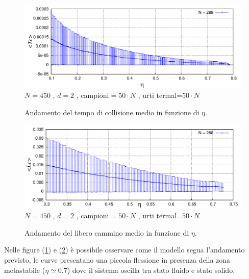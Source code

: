 \documentclass[11pt]{article}
\theoremstyle{plain}
\theoremstyle{remark}
\begin{document}
\begin{figure}[htbp]
\centering
\caption[Sfere Rigide$/$Problema2.cpp]{Andamento del tempo di collisione medio in funzione di $\eta$.}\vspace{-15pt}
\includegraphics[scale=0.95]{Immagini/Rigide/TcvsEta2D}
	\newline \footnotesize{$N= 450$ , $d=2$ , campioni$= 50\cdot N$ ,  urti termal=$ 50 \cdot N$}
	\label{fig: TcvsEta}
\end{figure}
\begin{figure}[htbp]
\centering
\caption[Sfere Rigide$/$Problema4.cpp]{Andamento del libero cammino medio in funzione di $\eta$.}\vspace{-15pt}
\includegraphics[scale=0.95]{Immagini/Rigide/LcvsEta2D}
	\newline \footnotesize{$N= 450$ , $d=2$ , campioni$= 50\cdot N$ ,  urti termal=$ 50 \cdot N$}
	\label{fig: LcvsEta}
\end{figure}

Nelle figure (\ref{fig: TcvsEta}) e (\ref{fig: LcvsEta}) è possibile osservare come il modello segua l'andamento previsto, le curve presentano una piccola flessione in presenza della zona metastabile ($\eta \simeq 0.7$) dove il sistema oscilla tra stato fluido e stato solido.
\end{document}
